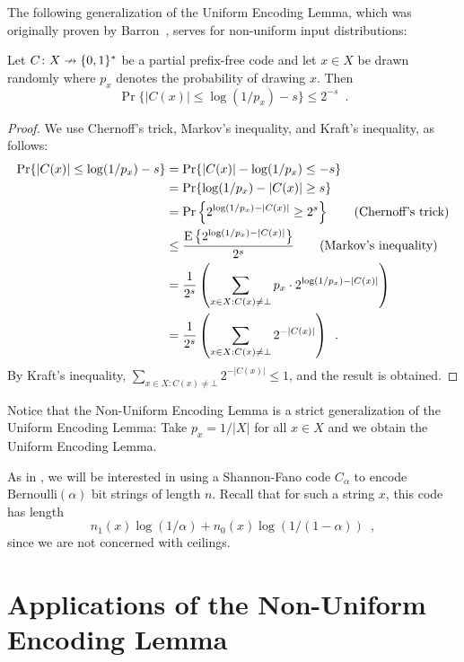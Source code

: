 \documentclass{patmorin}
\begin{document}
The following generalization of the Uniform Encoding Lemma, which was
originally proven by Barron~\cite[Theorem~3.1]{barron:dissertation},
serves for non-uniform input distributions:
\begin{lem}  
  Let $C\colon X\nrightarrow\{0,1\}^*$ be a partial prefix-free code
  and let $x\in X$ be drawn randomly where $p_x$ denotes the
  probability of drawing $x$.  Then
  \[
    \Pr\{ |C(x)| \le \log(1/p_x)-s\} \le 2^{-s} \enspace .
  \]
\end{lem}

\begin{proof}
  We use Chernoff's trick, Markov's inequality, and Kraft's
  inequality, as follows:
  \begin{align*}
    \Pr\{ |C(x)| \le\log(1/p_x)-s \}
    & = \Pr\{|C(x)| -\log(1/p_x) \le -s \} \\
    & = \Pr\{\log(1/p_x)-|C(x)| \ge s \} \\
    & = \Pr\left\{2^{\log(1/p_x)-|C(x)|} \ge 2^s \right\}  \tag{Chernoff's trick} \\
    & \le \frac{\operatorname{\mathrm{E}}\left\{2^{\log(1/p_x)-|C(x)|}\right\}}{2^s} \tag{Markov's inequality} \\
    & = \frac{1}{2^s} \left(\sum_{x\in X : C(x) \neq \bot} p_x\cdot 2^{\log(1/p_x)-|C(x)|}\right) \\
    & = \frac{1}{2^s} \left(\sum_{x\in X : C(x) \neq \bot }2^{-|C(x)|}\right) \enspace .
  \end{align*}
  By Kraft's inequality,
  $\sum_{x \in X : C(x) \neq \bot} 2^{-|C(x)|} \leq 1$, and the result
  is obtained.
\end{proof}

Notice that the Non-Uniform Encoding Lemma is a strict generalization
of the Uniform Encoding Lemma: Take $p_x=1/|X|$ for all $x\in X$ and
we obtain the Uniform Encoding Lemma.

As in , we will be interested in using a
Shannon-Fano code $C_\alpha$ to encode $\mathrm{Bernoulli}(\alpha)$
bit strings of length $n$. Recall that for such a string $x$, this
code has length
\[
  n_1(x) \log (1/\alpha) + n_0(x) \log(1/(1 - \alpha)) \enspace ,
\]
since we are not concerned with ceilings.

\section{Applications of the Non-Uniform Encoding Lemma}
\end{document}
